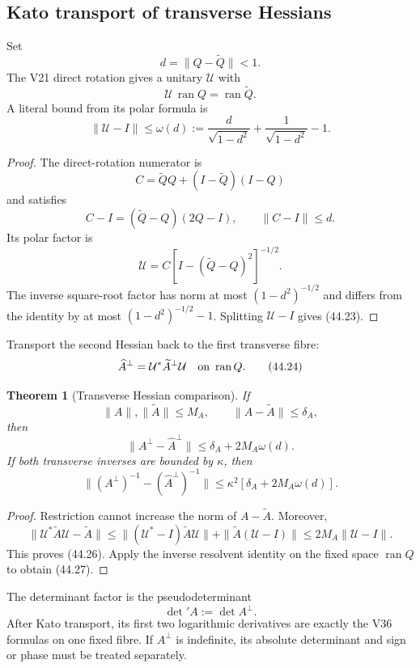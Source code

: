 \documentclass[11pt]{article}
\newtheorem{theorem}{Theorem}[section]
\begin{document}
\subsection{Kato transport of transverse Hessians}

Set
\[
 d=\|Q-\widetilde Q\|<1.
 \tag{44.21}
\]
The V21 direct rotation gives a unitary \(\mathcal U\) with
\[
 \mathcal U\,\operatorname{ran}Q
 =
 \operatorname{ran}\widetilde Q.
 \tag{44.22}
\]
A literal bound from its polar formula is
\[
 \|\mathcal U-I\|
 \leq
 \omega(d):=
 \frac d{\sqrt{1-d^2}}
 +\frac1{\sqrt{1-d^2}}-1.
 \tag{44.23}
\]

\begin{proof}
The direct-rotation numerator is
\[
 C=\widetilde QQ+(I-\widetilde Q)(I-Q)
\]
and satisfies
\[
 C-I=(\widetilde Q-Q)(2Q-I),
 \qquad \|C-I\|\leq d.
\]
Its polar factor is
\[
 \mathcal U=C[I-(\widetilde Q-Q)^2]^{-1/2}.
\]
The inverse square-root factor has norm at most
\((1-d^2)^{-1/2}\) and differs from the identity by at most
\((1-d^2)^{-1/2}-1\).  Splitting
\(\mathcal U-I\) gives (44.23).
\end{proof}

Transport the second Hessian back to the first transverse fibre:
\[
 \widehat A^\perp
 =
 \mathcal U^*\widetilde A^\perp\mathcal U
 \quad\hbox{on }\operatorname{ran}Q.
 \tag{44.24}
\]

\begin{theorem}[Transverse Hessian comparison]
\label{thm:v11v44-hessian-comparison}
If
\[
 \|A\|,\|\widetilde A\|\leq M_A,\qquad
 \|A-\widetilde A\|\leq\delta_A,
 \tag{44.25}
\]
then
\[
 \|A^\perp-\widehat A^\perp\|
 \leq
 \delta_A+2M_A\omega(d).
 \tag{44.26}
\]
If both transverse inverses are bounded by \(\kappa\), then
\[
 \|(A^\perp)^{-1}-(\widehat A^\perp)^{-1}\|
 \leq
 \kappa^2[
 \delta_A+2M_A\omega(d)].
 \tag{44.27}
\]
\end{theorem}

\begin{proof}
Restriction cannot increase the norm of \(A-\widetilde A\).
Moreover,
\[
 \|\mathcal U^*\widetilde A\mathcal U-\widetilde A\|
 \leq
 \|(\mathcal U^*-I)\widetilde A\mathcal U\|
 +\|\widetilde A(\mathcal U-I)\|
 \leq2M_A\|\mathcal U-I\|.
\]
This proves (44.26).  Apply the inverse resolvent identity on the fixed
space \(\operatorname{ran}Q\) to obtain (44.27).
\end{proof}

The determinant factor is the pseudodeterminant
\[
 \det{}'A:=\det A^\perp.
 \tag{44.28}
\]
After Kato transport, its first two logarithmic derivatives are exactly
the V36 formulas on one fixed fibre.  If \(A^\perp\) is indefinite, its
absolute determinant and sign or phase must be treated separately.
\end{document}
